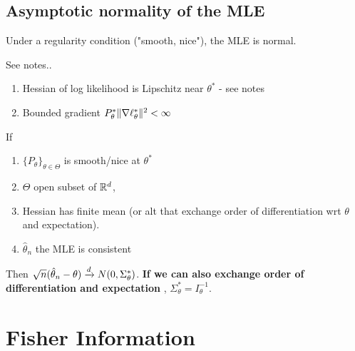 \documentclass{article}
\begin{document}
\subsection{Asymptotic normality of the MLE}
Under a regularity condition ("smooth, nice"), the MLE is normal.
\begin{definition}
See notes.. \begin{enumerate}
	\item Hessian of log likelihood is Lipschitz near $\theta^*$ - see notes 
	\item Bounded gradient $P_\theta^* \| \nabla \ell_\theta^* \|^2 <\infty $
\end{enumerate}
\end{definition}
\begin{theorem}
If \begin{enumerate}
	\item $\{P_\theta\}_{\theta \in \Theta}$ is smooth/nice at $\theta^*$
	\item $\Theta$ open subset of $\mathbb R^d$,  
	\item Hessian has finite mean (or alt that exchange order of differentiation wrt $\theta$ and expectation).
	\item $\hat \theta_n$ the MLE is  consistent 
\end{enumerate}
Then $\sqrt{n} (\hat \theta_n - \theta) \xrightarrow{d} N(0,\Sigma_\theta^*)$.
\textbf{If we can also exchange order of differentiation and expectation} , $\Sigma_\theta^* = I_\theta^{-1}$. 
\end{theorem}
\section{Fisher Information}
\end{document}
